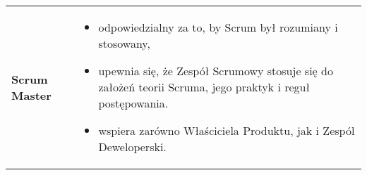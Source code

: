 \documentclass[a4paper]{article}
\begin{document}
\begin{table}[H]
\begin{center}
\begin{tabular}{ p{} p{} }
                \cmidrule(r){1-1}\cmidrule(l){2-2}
                \textbf{Scrum Master}
                &
                \begin{itemize}
                    \item odpowiedzialny za to, by Scrum był rozumiany i stosowany,
                    \item upewnia się, że Zespół Scrumowy stosuje się do założeń teorii Scruma, jego praktyk i reguł postępowania.
                    \item wspiera zarówno Właściciela Produktu, jak i Zespól Deweloperski.
                \end{itemize}
                \\
            \end{tabular}
        \end{center}
    \end{table}
\end{document}

